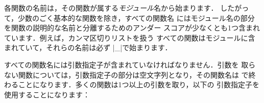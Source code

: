 \documentclass[uplatex,dvipdfmx,full,kernel]{wtpl3doc}
\begin{document}
各関数の名前は，その関数が属する\emph{モジュール}名から始まります．
したがって，少数のごく基本的な関数を除き，すべての関数名
にはモジュール名の部分を関数の説明的な名前と分離するためのアンダー
スコアが少なくとも1つ含まれています．例えば，カンマ区切りリストを扱う
すべての関数はモジュールに含まれていて，それらの名前は必ず
|\clist_|で始まります．

すべての関数名には引数指定子が含まれていなければなりません．引数を
取らない関数については，引数指定子の部分は空文字列となり，その関数名は
\code{:}で終わることになります．多くの関数は1つ以上の引数を取り，以下の
引数指定子を使用することになります：
%
\end{document}
